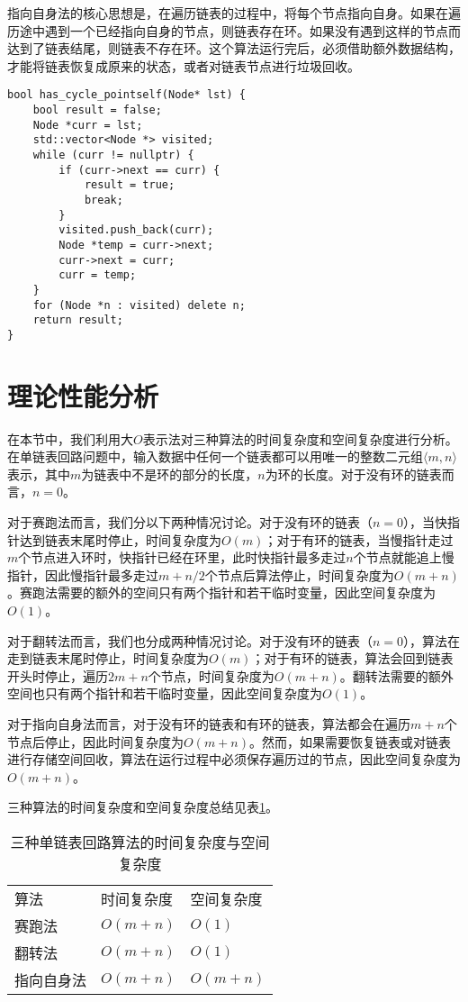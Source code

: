 \documentclass[UTF8]{ctexart}
\begin{document}
指向自身法的核心思想是，在遍历链表的过程中，将每个节点指向自身。如果在遍历途中遇到一个已经指向自身的节点，则链表存在环。如果没有遇到这样的节点而达到了链表结尾，则链表不存在环。这个算法运行完后，必须借助额外数据结构，才能将链表恢复成原来的状态，或者对链表节点进行垃圾回收。

\begin{lstlisting}
bool has_cycle_pointself(Node* lst) {
    bool result = false;
    Node *curr = lst;
    std::vector<Node *> visited;
    while (curr != nullptr) {
        if (curr->next == curr) {
            result = true;
            break;
        }
        visited.push_back(curr);
        Node *temp = curr->next;
        curr->next = curr;
        curr = temp;
    }
    for (Node *n : visited) delete n;
    return result;
}
\end{lstlisting}

\section{理论性能分析}

在本节中，我们利用大$O$表示法对三种算法的时间复杂度和空间复杂度进行分析。在单链表回路问题中，输入数据中任何一个链表都可以用唯一的整数二元组$\langle m, n \rangle$表示，其中$m$为链表中不是环的部分的长度，$n$为环的长度。对于没有环的链表而言，$n=0$。

对于赛跑法而言，我们分以下两种情况讨论。对于没有环的链表（$n=0$），当快指针达到链表末尾时停止，时间复杂度为$O(m)$；对于有环的链表，当慢指针走过$m$个节点进入环时，快指针已经在环里，此时快指针最多走过$n$个节点就能追上慢指针，因此慢指针最多走过$m+n/2$个节点后算法停止，时间复杂度为$O(m+n)$。赛跑法需要的额外的空间只有两个指针和若干临时变量，因此空间复杂度为$O(1)$。

对于翻转法而言，我们也分成两种情况讨论。对于没有环的链表（$n=0$），算法在走到链表末尾时停止，时间复杂度为$O(m)$；对于有环的链表，算法会回到链表开头时停止，遍历$2m+n$个节点，时间复杂度为$O(m+n)$。翻转法需要的额外空间也只有两个指针和若干临时变量，因此空间复杂度为$O(1)$。

对于指向自身法而言，对于没有环的链表和有环的链表，算法都会在遍历$m+n$个节点后停止，因此时间复杂度为$O(m+n)$。然而，如果需要恢复链表或对链表进行存储空间回收，算法在运行过程中必须保存遍历过的节点，因此空间复杂度为$O(m+n)$。

三种算法的时间复杂度和空间复杂度总结见表\ref{tab:complexity}。

\begin{table}
\centering
\begin{tabular}{lll}
 算法 & 时间复杂度 & 空间复杂度 \\ 
\hhline{===}
赛跑法 & $O(m+n)$ & $O(1)$  \\ 
\hline
翻转法 & $O(m+n)$ & $O(1)$  \\ 
\hline
指向自身法 & $O(m+n)$ & $O(m+n)$
\end{tabular}
\caption{三种单链表回路算法的时间复杂度与空间复杂度}
\label{tab:complexity}
\end{table}
\end{document}
